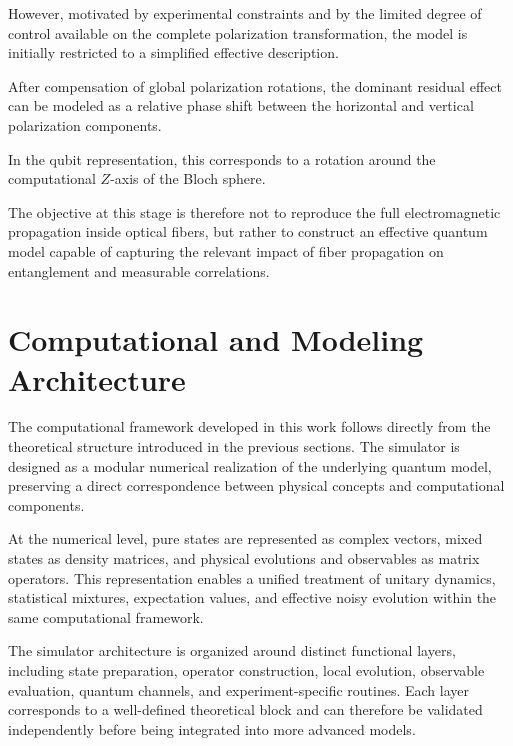 However, motivated by experimental constraints and by the limited degree of control available on the complete polarization transformation, the model is initially restricted to a simplified effective description.

\medskip

After compensation of global polarization rotations, the dominant residual effect can be modeled as a relative phase shift between the horizontal and vertical polarization components.

In the qubit representation, this corresponds to a rotation around the computational \( Z \)-axis of the Bloch sphere.

\medskip

The objective at this stage is therefore not to reproduce the full electromagnetic propagation inside optical fibers, but rather to construct an effective quantum model capable of capturing the relevant impact of fiber propagation on entanglement and measurable correlations.


\section{Computational and Modeling Architecture}

The computational framework developed in this work follows directly from the theoretical structure introduced in the previous sections. The simulator is designed as a modular numerical realization of the underlying quantum model, preserving a direct correspondence between physical concepts and computational components.

\medskip

At the numerical level, pure states are represented as complex vectors, mixed states as density matrices, and physical evolutions and observables as matrix operators. This representation enables a unified treatment of unitary dynamics, statistical mixtures, expectation values, and effective noisy evolution within the same computational framework.

\medskip

The simulator architecture is organized around distinct functional layers, including state preparation, operator construction, local evolution, observable evaluation, quantum channels, and experiment-specific routines. Each layer corresponds to a well-defined theoretical block and can therefore be validated independently before being integrated into more advanced models.

